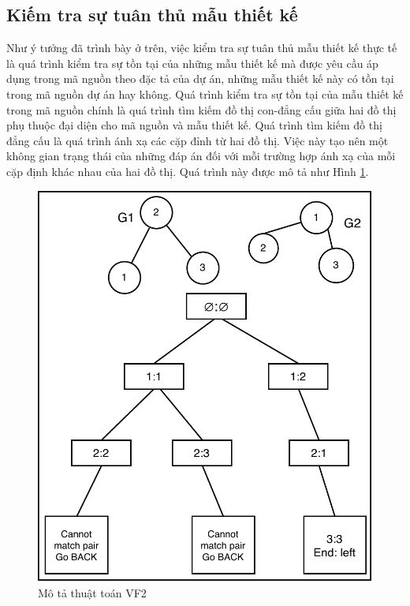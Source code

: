 \documentclass[12pt]{report}
\begin{document}
\subsection{Kiếm tra sự tuân thủ mẫu thiết kế}
Như ý tưởng đã trình bày ở trên, việc kiểm tra sự tuân thủ mẫu thiết kế thực tế là quá trình kiểm tra sự tồn tại của những mẫu thiết kế mà được yêu cầu áp dụng trong mã nguồn theo đặc tả của dự án, những mẫu thiết kế này có tồn tại trong mã nguồn dự án hay không.
Quá trình kiểm tra sự tồn tại của mẫu thiết kế trong mã nguồn chính là quá trình tìm kiếm đồ thị con-đẳng cấu giữa hai đồ thị phụ thuộc đại diện cho mã nguồn và mẫu thiết kế. Quá trình tìm kiếm đồ thị đẳng cấu là quá trình ánh xạ các cặp đỉnh từ hai đồ thị. Việc này tạo nên một không gian trạng thái của những đáp án đối với mỗi trường hợp ánh xạ của mỗi cặp định khác nhau của hai đồ thị. Quá trình này được mô tả như Hình \ref{fig:vf2_example}.
\begin{figure}[!htbp]
	\centering
	\includegraphics[scale=1]{images/_vf2_example.pdf}
	\caption{Mô tả thuật toán VF2}
	\label{fig:vf2_example}
\end{figure}\\
\end{document}
